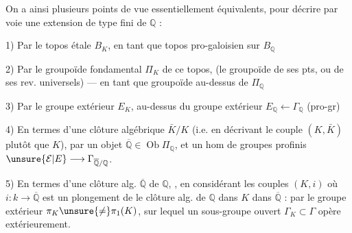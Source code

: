 On a ainsi plusieurs points de vue essentiellement équivalents, pour décrire par voie  une extension  de type fini de $\mathbb Q$ :

1) Par le topos étale $B_K$, en tant que topos pro-galoisien sur $B_{\mathbb Q}$

2) Par le groupoïde fondamental $\Pi_K$ de ce topos, (le groupoïde de ses pts, ou de ses rev. universels) --- en tant que groupoïde au-dessus de $\Pi_{\mathbb Q}$

 3) Par le groupe extérieur $E_K$, au-dessus du groupe extérieur $E_{\mathbb Q}\longleftarrow\Gamma_{\mathbb Q}$ (pro-gr)

4) En termes d'une clôture algébrique $\bar K/K$ (i.e. en décrivant le couple $(K,\bar K)$ plutôt que $K$), par un objet $\overline{\mathbb Q}\in\operatorname{Ob}\Pi_{\mathbb Q}$, et un hom de groupes profinis $\unsure{\mathcal E|E}\longrightarrow\Gamma_{\overline{\mathbb Q}/\mathbb Q}$.

5) En termes d'une clôture alg.  $\overline{\mathbb Q}$ de $\mathbb Q$, ,  en considérant les couples $(K,i)$ où $i:k\longrightarrow\overline{\mathbb Q}$ est un plongement de le clôture alg. de $\mathbb Q$ dans $K$ dans $\overline{\mathbb Q}$ :  par le groupe extérieur $\pi_K\unsure{\neq}\pi_1(K)$, sur lequel un sous-groupe ouvert $\Gamma_K\subset\Gamma$ opère extérieurement.


